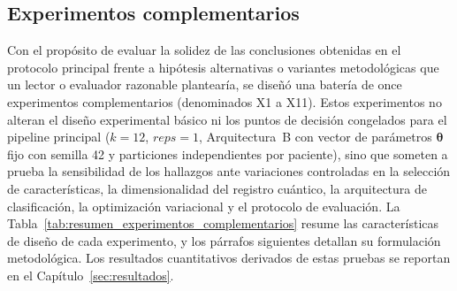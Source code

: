 
\begingroup
\setlength{\emergencystretch}{3em}
\subsection{Experimentos complementarios}
\label{sec:experimentos_complementarios}

Con el propósito de evaluar la solidez de las conclusiones obtenidas en el protocolo principal frente a hipótesis
alternativas o variantes metodológicas que un lector o evaluador razonable plantearía, se diseñó una batería de once
experimentos complementarios (denominados X1 a X11). Estos experimentos no alteran el diseño experimental básico ni
los puntos de decisión congelados para el pipeline principal ($k = 12$, $reps = 1$, Arquitectura~B con vector de
parámetros $\boldsymbol\theta$ fijo con semilla 42 y particiones independientes por paciente), sino que someten a
prueba la sensibilidad de los hallazgos ante variaciones controladas en la selección de características, la dimensionalidad
del registro cuántico, la arquitectura de clasificación, la optimización variacional y el protocolo de evaluación.
La Tabla~\ref{tab:resumen_experimentos_complementarios} resume las características de diseño de cada experimento, y
los párrafos siguientes detallan su formulación metodológica. Los resultados cuantitativos derivados de estas pruebas se
reportan en el Capítulo~\ref{sec:resultados}.


